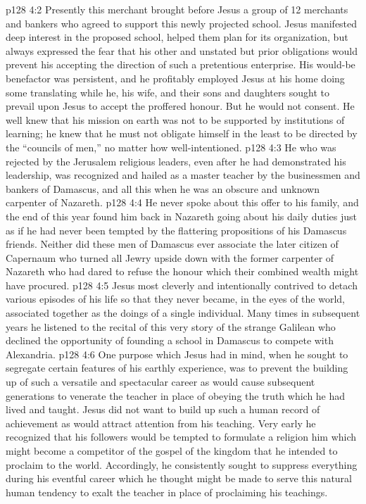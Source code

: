\vs p128 4:2 Presently this merchant brought before Jesus a group of 12 merchants and bankers who agreed to support this newly projected school. Jesus manifested deep interest in the proposed school, helped them plan for its organization, but always expressed the fear that his other and unstated but prior obligations would prevent his accepting the direction of such a pretentious enterprise. His would\hyp{}be benefactor was persistent, and he profitably employed Jesus at his home doing some translating while he, his wife, and their sons and daughters sought to prevail upon Jesus to accept the proffered honour. But he would not consent. He well knew that his mission on earth was not to be supported by institutions of learning; he knew that he must not obligate himself in the least to be directed by the “councils of men,” no matter how well\hyp{}intentioned.
\vs p128 4:3 He who was rejected by the Jerusalem religious leaders, even after he had demonstrated his leadership, was recognized and hailed as a master teacher by the businessmen and bankers of Damascus, and all this when he was an obscure and unknown carpenter of Nazareth.
\vs p128 4:4 He never spoke about this offer to his family, and the end of this year found him back in Nazareth going about his daily duties just as if he had never been tempted by the flattering propositions of his Damascus friends. Neither did these men of Damascus ever associate the later citizen of Capernaum who turned all Jewry upside down with the former carpenter of Nazareth who had dared to refuse the honour which their combined wealth might have procured.
\vs p128 4:5 \pc Jesus most cleverly and intentionally contrived to detach various episodes of his life so that they never became, in the eyes of the world, associated together as the doings of a single individual. Many times in subsequent years he listened to the recital of this very story of the strange Galilean who declined the opportunity of founding a school in Damascus to compete with Alexandria.
\vs p128 4:6 One purpose which Jesus had in mind, when he sought to segregate certain features of his earthly experience, was to prevent the building up of such a versatile and spectacular career as would cause subsequent generations to venerate the teacher in place of obeying the truth which he had lived and taught. Jesus did not want to build up such a human record of achievement as would attract attention from his teaching. Very early he recognized that his followers would be tempted to formulate a religion  him which might become a competitor of the gospel of the kingdom that he intended to proclaim to the world. Accordingly, he consistently sought to suppress everything during his eventful career which he thought might be made to serve this natural human tendency to exalt the teacher in place of proclaiming his teachings.
